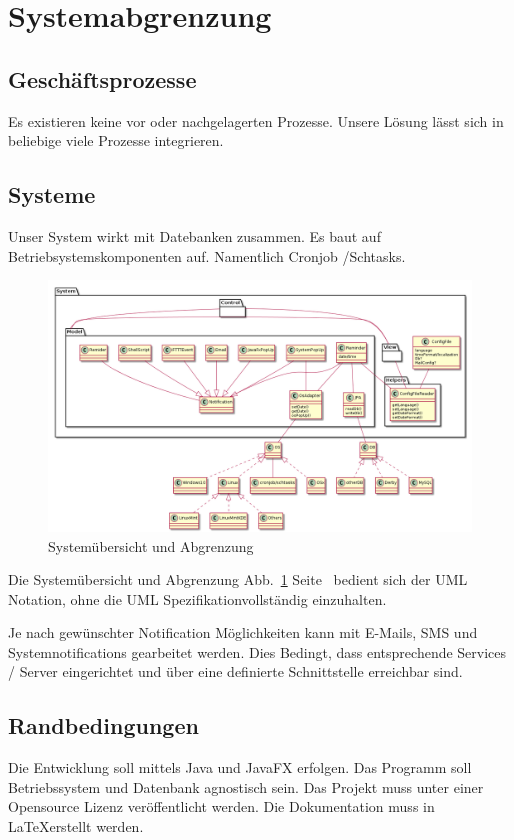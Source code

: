 \documentclass[11pt,titelpage]{scrreprt}
\begin{document}
\section {Systemabgrenzung}
\subsection{Geschäftsprozesse}
Es existieren keine vor\- oder nachgelagerten Prozesse. Unsere Lösung lässt sich in beliebige viele Prozesse integrieren.
\subsection{Systeme}
Unser System wirkt mit Datebanken zusammen. Es baut auf Betriebsystemskomponenten auf. Namentlich Cronjob /Schtasks.
\begin{landscape}
\begin{figure}
  \centering
    \includegraphics[width=1\textwidth]{../uml/uebersicht.png}
  \caption{Systemübersicht und Abgrenzung}
  \label{fig:overview}
\end{figure}
\end{landscape}
Die Systemübersicht und Abgrenzung Abb.~\ref{fig:overview} Seite~\pageref{fig:overview} bedient sich der UML Notation, ohne die UML Spezifikationvollständig einzuhalten.
\pageref{fig:overview}






Je nach gewünschter Notification Möglichkeiten kann mit E-Mails, SMS und Systemnotifications gearbeitet werden. Dies Bedingt, dass entsprechende Services / Server eingerichtet und über eine definierte Schnittstelle erreichbar sind.
\subsection{Randbedingungen}
Die Entwicklung soll mittels Java und JavaFX erfolgen.
Das Programm soll Betriebssystem und Datenbank agnostisch sein. Das Projekt muss unter einer Opensource Lizenz veröffentlicht werden.
Die Dokumentation muss in \LaTeX erstellt werden.
\end{document}
